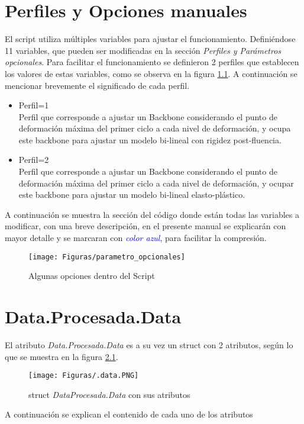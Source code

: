 \documentclass[a4paper, 11pt,article,oneside]{memoir}%
\begin{document}
\chapter{Perfiles y Opciones manuales}
El script utiliza múltiples variables para ajustar el funcionamiento. Definiéndose 11 variables, que pueden ser modificadas en la sección \textit{ Perfiles y Parámetros opcionales}. Para facilitar el funcionamiento se definieron 2 perfiles que establecen los valores de estas variables, como se observa en la figura \ref{fig:perfeeee}.
A continuación se mencionar brevemente el significado de cada perfil.
\begin{itemize}
    \item Perfil=1\\
    Perfil que  corresponde a ajustar un Backbone considerando el punto de deformación máxima del primer ciclo a cada nivel de deformación, y ocupa este backbone para ajustar un modelo bi-lineal con rigidez post-fluencia.
    \item Perfil=2\\
   Perfil que corresponde a ajustar un Backbone considerando el punto de deformación máxima del primer ciclo a cada nivel de deformación, y ocupar este backbone para ajustar un modelo bi-lineal elasto-plástico.
\end{itemize}
A continuación se muestra la sección del código donde están todas las variables a modificar, con una breve descripción, en el presente manual se explicarán con mayor detalle  y se marcaran con \textit{\textcolor{blue}{color azul}}, para facilitar la compresión.
 \begin{figure}[H]
    \centering
    \texttt{[image: Figuras/parametro\_opcionales]}
    \caption{Algunas opciones dentro del Script}
    \label{fig:perfeeee}
\end{figure}
\newpage
\chapter{Data.Procesada.Data}
 El atributo \textit{Data.Procesada.Data} es a su vez un struct con 2 atributos, según lo que se muestra en la figura \ref{fig:.datab }.\par
\begin{figure}[h!]
    \centering
    \texttt{[image: Figuras/.data.PNG]}
    \caption{struct \textit{DataProcesada.Data} con sus atributos}
    \label{fig:.datab }
\end{figure}
A continuación se explican el contenido de cada uno de los atributos 
\end{document}
